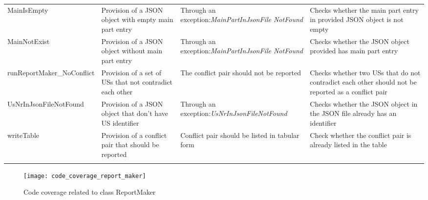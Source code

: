 \begin{tabularx}{\textwidth}{X  X  X  X}
	MainIsEmpty&Provision of a JSON object with empty main part entry&Through an exception:\textit{MainPartInJsonFile NotFound }&Checks whether the main part entry in provided JSON object is not empty\\
	
	MainNotExist&Provision of a JSON object without main part entry&Through an exception:\textit{MainPartInJsonFile NotFound }&Checks whether the JSON object provided has main part entry\\
	
	runReportMaker\_NoConflict&Provision of a set of USs that not contradict each other&The conflict pair should not be reported&Checks whether two USs that do not contradict each other should not be reported as a conflict pair\\
	
	UsNrInJsonFileNotFound&Provision of a JSON object that don't have US identifier&Through an exception:\textit{UsNrInJsonFileNotFound}&Checks whether the JSON object in the JSON file already has an identifier\\
	
	writeTable&Provision of a conflict pair that should be reported&Conflict pair should be listed in tabular form&Check whether the conflict pair is already listed in the table\\
	\hline
	\caption{Test cases for ReportMaker  class}\label{tb:test_cases_report_maker}
\end{tabularx}

\endgroup
\thispagestyle{empty}

\begin{figure}[h]
	\centering
	\texttt{[image: code\_coverage\_report\_maker]}
	\caption{Code coverage related to class ReportMaker}\label{fig:code_coverage_report_maker}
\end{figure}


